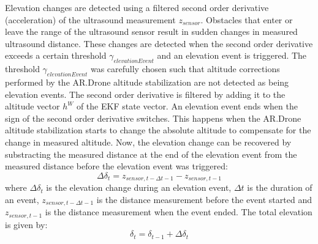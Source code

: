 Elevation changes are detected using a filtered second order derivative (acceleration) of the ultrasound measurement $z_{sensor}$.
Obstacles that enter or leave the range of the ultrasound sensor result in sudden changes in measured ultrasound distance.
These changes are detected when the second order derivative exceeds a certain threshold $\gamma_{elevationEvent}$ and an elevation event is triggered.
The threshold $\gamma_{elevationEvent}$ was carefully chosen such that altitude corrections performed by the AR.Drone altitude stabilization are not detected as being elevation events.
The second order derivative is filtered by adding it to the altitude vector $h^W$ of the EKF state vector.
An elevation event ends when the sign of the second order derivative switches.
This happens when the AR.Drone altitude stabilization starts to change the absolute altitude to compensate for the change in measured altitude.
Now, the elevation change can be recovered by substracting the measured distance at the end of the elevation event from the measured distance before the elevation event was triggered:
\begin{equation}
\Delta\delta_{t} = z_{sensor, t-\Delta t-1} - z_{sensor, t-1}
\end{equation}
where $\Delta\delta_{t}$ is the elevation change during an elevation event, $\Delta t$ is the duration of an event, $z_{sensor, t-\Delta t-1}$ is the distance measurement before the event started and $z_{sensor, t-1}$ is the distance measurement when the event ended.
The total elevation is given by:
\begin{equation}
\delta_{t} = \delta_{t-1} + \Delta\delta_{t}
\end{equation}

